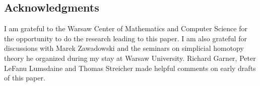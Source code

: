 \documentclass{tac}
\begin{document}
\subsection*{Acknowledgments} 
I am grateful to the Warsaw Center of Mathematics and Computer Science for the 
opportunity to do the research leading to this paper. I am also grateful for 
discussions with Marek Zawadowski and the seminars on simplicial homotopy 
theory he organized during my stay at Warsaw University. Richard Garner, Peter 
LeFanu Lumsdaine and Thomas Streicher made helpful comments on early drafts 
of this paper.













\printbibliography
\end{document}

